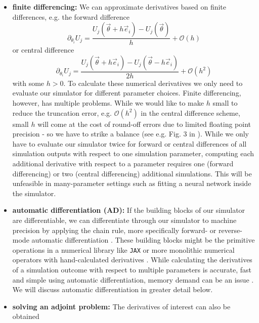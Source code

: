 \begin{itemize}
    \item \textbf{finite differencing:} We can approximate derivatives based on finite differences,
    e.g. the forward difference
    \begin{equation}
        \partial_{\theta_i} U_j = \frac{U_j(\vec{\theta} + h \vec{e}_i) - U_j(\vec{\theta})}{h} + \mathcal{O}(h)
    \end{equation}
    or central difference
    \begin{equation}
        \partial_{\theta_i} U_j = \frac{U_j(\vec{\theta} + h \vec{e}_i) - U_j(\vec{\theta} - h \vec{e}_i)}{2h} + \mathcal{O}(h^2)
    \end{equation}
    with some $h>0$. To calculate these numerical derivatives we only
    need to evaluate our simulator for different parameter choices.
    Finite differencing, however, has multiple problems. While we would like to make $h$ small to reduce
    the truncation error, e.g. $\mathcal{O}(h^2)$ in the central difference scheme, small $h$ will come at the cost
    of round-off errors due to limited floating point precision - so we have to strike a balance (see e.g. Fig. 3 in
    \cite{baydin18}). While we only have to evaluate our simulator twice for forward or central differences
    of all simulation outputs with respect to one simulation parameter, computing each additional 
    derivative with respect to a parameter requires one 
    (forward differencing) or two (central differencing) additional simulations.
    This will be unfeasible in many-parameter settings such as fitting a neural network inside the simulator.
    \item \textbf{automatic differentiation (AD):} If the building blocks of our simulator
    are differentiable, we can differentiate through our simulator to machine precision by applying the
    chain rule, more specifically forward- or reverse-mode automatic differentiation \citep{baydin18}.
    These building blocks might be the primitive operations in a numerical library like \texttt{JAX}
    \citep{jax} or more monolithic numerical operators with hand-calculated derivatives \citep[e.g. of an advection step in][Sec. 13]{thuerey25}. While calculating the derivatives of a simulation
    outcome with respect to multiple parameters is accurate, fast and simple using
    automatic differentiation, memory demand can be an issue \citep[Sec. 5.1.1.2]{diffrax}.
    We will discuss automatic differentiation in greater detail below.
    \item \textbf{solving an adjoint problem:} The derivatives of interest can also be obtained

\end{itemize}
